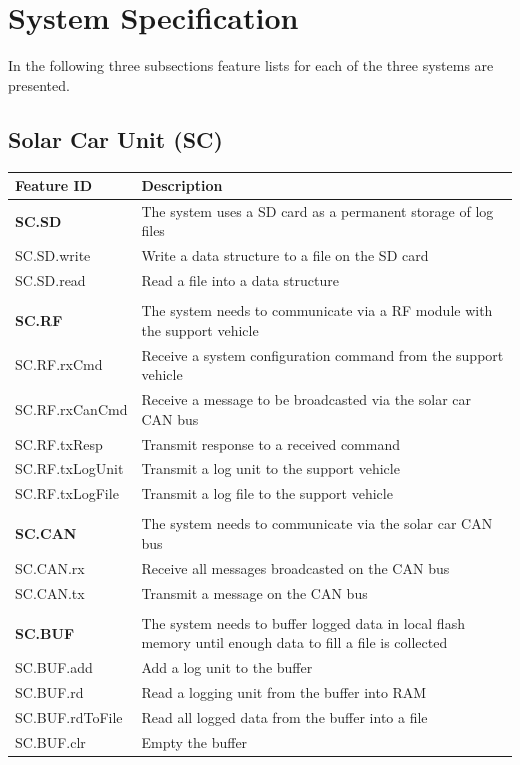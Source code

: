 \documentclass[]{article}
\begin{document}
\section{System Specification}

In the following three subsections feature lists for each of the three systems are presented.

\subsection{Solar Car Unit (SC)}
\begin{table}[H]
    \centering
    \begin{tabular}{|l|l|}
    \hline
        \textbf{Feature ID} & \textbf{Description} \\ \hline
        \textbf{SC.SD} & The system uses a SD card as a permanent storage of log files \\ \hline
        SC.SD.write & Write a data structure to a file on the SD card \\ \hline
        SC.SD.read & Read a file into a data structure \\ \hline
         &  \\ \hline
        \textbf{SC.RF} & The system needs to communicate via a RF module with the support vehicle \\ \hline
        SC.RF.rxCmd & Receive a system configuration command from the support vehicle \\ \hline
        SC.RF.rxCanCmd & Receive a message to be broadcasted via the solar car CAN bus \\ \hline
        SC.RF.txResp & Transmit response to a received command \\ \hline
        SC.RF.txLogUnit & Transmit a log unit to the support vehicle \\ \hline
        SC.RF.txLogFile & Transmit a log file to the support vehicle \\ \hline
         &  \\ \hline
        \textbf{SC.CAN} & The system needs to communicate via the solar car CAN bus \\ \hline
        SC.CAN.rx & Receive all messages broadcasted on the CAN bus \\ \hline
        SC.CAN.tx & Transmit a message on the CAN bus \\ \hline
         &  \\ \hline
        \textbf{SC.BUF} & The system needs to buffer logged data in local flash memory until enough data to fill a file is collected \\ \hline
        SC.BUF.add & Add a log unit to the buffer \\ \hline
        SC.BUF.rd & Read a logging unit from the buffer into RAM \\ \hline
        SC.BUF.rdToFile & Read all logged data from the buffer into a file \\ \hline
        SC.BUF.clr & Empty the buffer \\ \hline
    \end{tabular}
\end{table}
\end{document}
